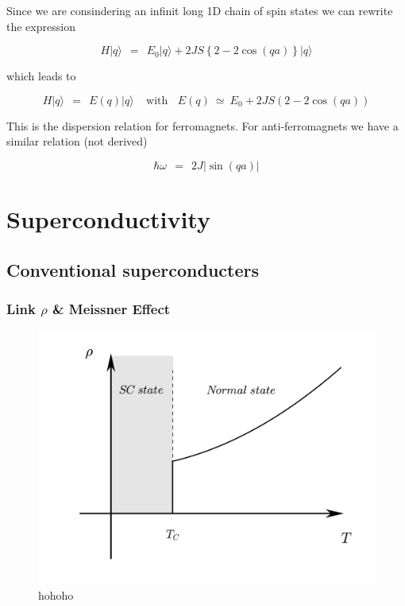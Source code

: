 \documentclass[10pt]{report}
\numberwithin{equation}{chapter}
\begin{document}


Since we are consindering an infinit long 1D chain of spin states we can rewrite the expression

\begin{equation}
  H |q\rangle ~~=~~ E_0 |q\rangle + 2JS \left\{ 2 - 2\cos(qa) \right\} |q\rangle
\end{equation} 

which leads to

\begin{equation}
  H |q\rangle ~~=~~ E(q) |q\rangle ~~~~~ \text{with} ~~~~ E(q) ~≃~ E_0 + 2JS(2 - 2\cos(qa))
\end{equation}

This is the dispersion relation for ferromagnets. For anti-ferromagnets we have a similar relation (not derived)

\begin{equation}
  \hbar \omega ~~=~~ 2J | \sin(qa) |
\end{equation}



\chapter{Superconductivity}

\section{Conventional superconducters}

\subsection{Link $\rho$ \& Meissner Effect}

\begin{figure}
  \centering
  \includegraphics[width=0.7\linewidth]{../img/sc_resistivity_drop.pdf}
  \caption{hohoho}
  \label{fig:sc_res_drop}
\end{figure}
\end{document}
